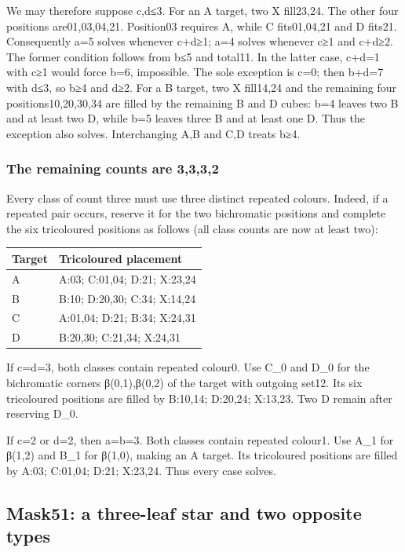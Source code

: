 \documentclass[
  10pt,
]{article}
\begin{document}
We may therefore suppose c,d≤3. For an A target, two X fill23,24. The
other four positions are01,03,04,21. Position03 requires A, while C
fits01,04,21 and D fits21. Consequently a=5 solves whenever c+d≥1; a=4
solves whenever c≥1 and c+d≥2. The former condition follows from b≤5 and
total11. In the latter case, c+d=1 with c≥1 would force b=6, impossible.
The sole exception is c=0; then b+d=7 with d≤3, so b≥4 and d≥2. For a B
target, two X fill14,24 and the remaining four positions10,20,30,34 are
filled by the remaining B and D cubes: b=4 leaves two B and at least two
D, while b=5 leaves three B and at least one D. Thus the exception also
solves. Interchanging A,B and C,D treats b≥4.

\hypertarget{the-remaining-counts-are-3332}{%
\subsubsection*{The remaining counts are
3,3,3,2}\label{the-remaining-counts-are-3332}}

Every class of count three must use three distinct repeated colours.
Indeed, if a repeated pair occurs, reserve it for the two bichromatic
positions and complete the six tricoloured positions as follows (all
class counts are now at least two):

\begin{longtable}[]{@{}ll@{}}
\toprule\noalign{}
Target & Tricoloured placement \\
\midrule\noalign{}
\endhead
\bottomrule\noalign{}
\endlastfoot
A & A:03; C:01,04; D:21; X:23,24 \\
B & B:10; D:20,30; C:34; X:14,24 \\
C & A:01,04; D:21; B:34; X:24,31 \\
D & B:20,30; C:21,34; X:24,31 \\
\end{longtable}

If c=d=3, both classes contain repeated colour0. Use C\_0 and D\_0 for
the bichromatic corners β(0,1),β(0,2) of the target with outgoing set12.
Its six tricoloured positions are filled by B:10,14; D:20,24; X:13,23.
Two D remain after reserving D\_0.

If c=2 or d=2, then a=b=3. Both classes contain repeated colour1. Use
A\_1 for β(1,2) and B\_1 for β(1,0), making an A target. Its tricoloured
positions are filled by A:03; C:01,04; D:21; X:23,24. Thus every case
solves.

\hypertarget{mask51-a-three-leaf-star-and-two-opposite-types}{%
\subsection*{Mask51: a three-leaf star and two opposite
types}\label{mask51-a-three-leaf-star-and-two-opposite-types}}
\end{document}
